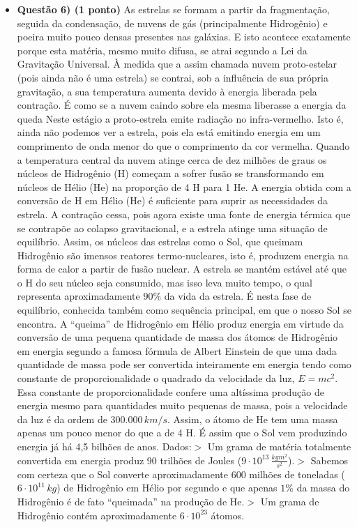 \documentclass[a4paper, 12pt]{article}
\begin{document}
\begin{flushleft}
\begin{itemize}
            \item \textbf{Questão 6) (1 ponto)} As estrelas se formam a partir da fragmentação, seguida da condensação, de nuvens de gás (principalmente Hidrogênio) e poeira muito pouco densas presentes nas galáxias. E isto acontece exatamente porque esta matéria, mesmo muito difusa, se atrai segundo a Lei da Gravitação Universal. À medida que a assim chamada nuvem proto-estelar (pois ainda não é uma estrela) se contrai, sob a influência de sua própria gravitação, a sua temperatura aumenta devido à energia liberada pela contração. É como se a nuvem caindo sobre ela mesma liberasse a energia da queda Neste estágio a proto-estrela emite radiação no infra-vermelho. Isto é, ainda não podemos ver a estrela, pois ela está emitindo energia em um comprimento de onda menor do que o comprimento da cor vermelha. Quando a temperatura central da nuvem atinge cerca de dez milhões de graus os núcleos de Hidrogênio (H) começam a sofrer fusão se transformando em núcleos de Hélio (He) na proporção de 4 H para 1 He. A energia obtida com a conversão de H em Hélio (He) é suficiente para suprir as necessidades da estrela. A contração cessa, pois agora existe uma fonte de energia térmica que se contrapõe ao colapso gravitacional, e a estrela atinge uma situação de equilíbrio. Assim, os núcleos das estrelas como o Sol, que queimam Hidrogênio são imensos reatores termo-nucleares, isto é, produzem energia na forma de calor a partir de fusão nuclear. A estrela se mantém estável até que o H do seu núcleo seja consumido, mas isso leva muito tempo, o qual representa aproximadamente $90\%$ da vida da estrela. É nesta fase de equilíbrio, conhecida também como sequência principal, em que o nosso Sol se encontra. A “queima” de Hidrogênio em Hélio produz energia em virtude da conversão de uma pequena quantidade de massa dos átomos de Hidrogênio em energia segundo a famosa fórmula de Albert Einstein de que uma dada quantidade de massa pode ser convertida inteiramente em energia tendo como constante de proporcionalidade o quadrado da velocidade da luz, $E = mc^2$. Essa constante de proporcionalidade confere uma altíssima produção de energia mesmo para quantidades muito pequenas de massa, pois a velocidade da luz é da ordem de $300.000 \, km/s$. Assim, o átomo de He tem uma massa apenas um pouco menor do que a de 4 H. É assim que o Sol vem produzindo energia já há 4,5 bilhões de anos. \linebreak \linebreak Dados:\linebreak$>$ Um grama de matéria totalmente convertida em energia produz 90 trilhões de Joules ($9 \cdot 10^{13} \, \frac{kgm^2}{s^2}$).\linebreak$>$ Sabemos com certeza que o Sol converte aproximadamente 600 milhões de toneladas ($6 \cdot 10^{11} \, kg$) de Hidrogênio em Hélio por segundo e que apenas $1\%$ da massa do Hidrogênio é de fato “queimada” na produção de He.\linebreak$>$ Um grama de Hidrogênio contém aproximadamente $6 \cdot 10^{23}$ átomos.

\end{itemize}
\end{flushleft}
\end{document}

